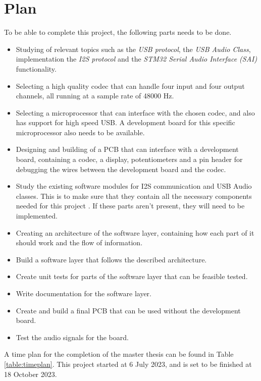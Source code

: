 \section{Plan}

To be able to complete this project, the following parts needs to be done.

\begin{itemize}
	\item Studying of relevant topics such as the \textit{USB protocol}, the \textit{USB Audio Class}, 
	implementation the \textit{I2S protocol} and the \textit{STM32 Serial Audio Interface (SAI)} 
	functionality.
	\item Selecting a high quality codec that can handle four input and four output channels, all 
	running at a sample rate of 48000 Hz.
	\item Selecting a microprocessor that can interface with the chosen codec, and also has support for
	high speed USB. A development board for this specific microprocessor also needs to be available.
	\item Designing and building of a PCB that can interface with a development board, containing a codec, 
	a display, potentiometers and a pin header for debugging the wires between the development board and 
	the codec.
	\item Study the existing software modules for I2S communication and USB Audio classes. This is to make
	sure that they contain all the necessary components needed for this project . 
	If these parts aren't present, they will need to be implemented.
	\item Creating an architecture of the software layer, containing how each part of it should work and 
	the flow of information.
	\item Build a software layer that follows the described architecture.
	\item Create unit tests for parts of the software layer that can be feasible tested.
	\item Write documentation for the software layer.
	\item Create and build a final PCB that can be used without the development board.
	\item Test the audio signals for the board.
\end{itemize}

A time plan for the completion of the master thesis can be found in Table \ref{table:timeplan}.
This project started at 6 July 2023, and is set to be finished at 18 October 2023.

